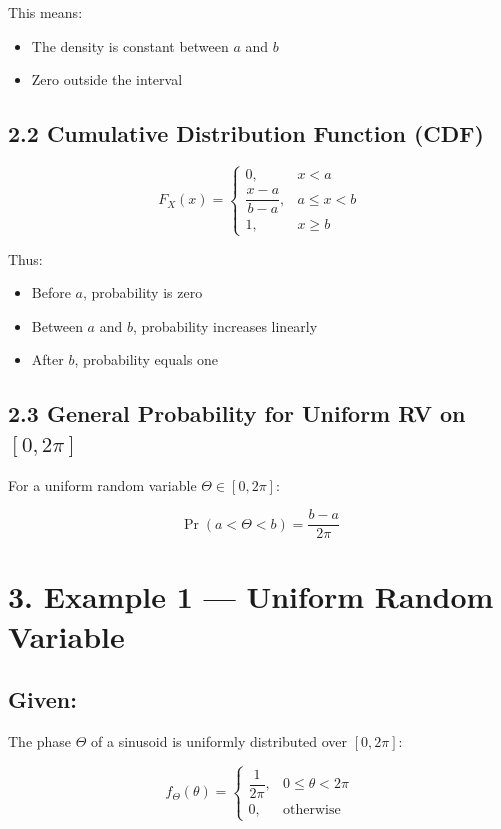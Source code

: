 \documentclass[12pt]{article}
\begin{document}
This means:

\begin{itemize}
\item The density is constant between \( a \) and \( b \)
\item Zero outside the interval
\end{itemize}

\subsection*{2.2 Cumulative Distribution Function (CDF)}

\[
F_X(x) =
\begin{cases}
0, & x < a \\
\dfrac{x-a}{b-a}, & a \le x < b \\
1, & x \ge b
\end{cases}
\]

Thus:

\begin{itemize}
\item Before \( a \), probability is zero
\item Between \( a \) and \( b \), probability increases linearly
\item After \( b \), probability equals one
\end{itemize}

\subsection*{2.3 General Probability for Uniform RV on \( [0, 2\pi] \)}

For a uniform random variable \( \Theta \in [0,2\pi] \):

\[
\Pr(a < \Theta < b) = \frac{b-a}{2\pi}
\]

\section*{3. Example 1 — Uniform Random Variable}

\subsection*{Given:}

The phase \( \Theta \) of a sinusoid is uniformly distributed over \( [0,2\pi] \):

\[
f_\Theta(\theta) =
\begin{cases}
\dfrac{1}{2\pi}, & 0 \le \theta < 2\pi \\
0, & \text{otherwise}
\end{cases}
\]
\end{document}
